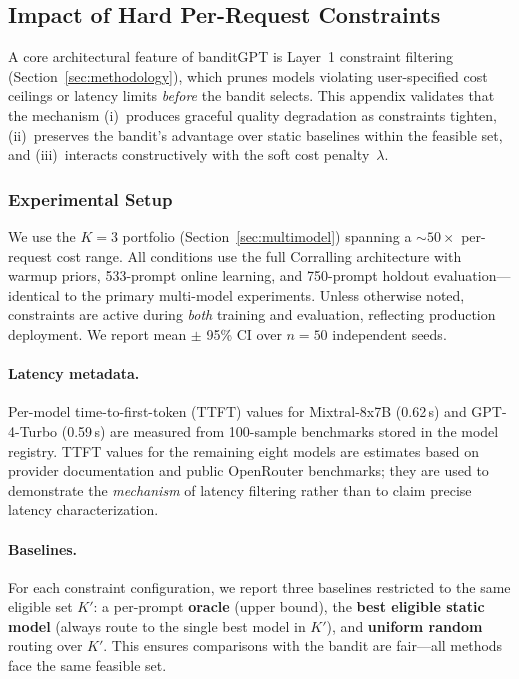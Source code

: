 
\subsection{Impact of Hard Per-Request Constraints}
\label{app:constraint_impact}

A core architectural feature of banditGPT is Layer~1 constraint filtering (Section~\ref{sec:methodology}), which prunes models violating user-specified cost ceilings or latency limits \emph{before} the bandit selects.
This appendix validates that the mechanism (i)~produces graceful quality degradation as constraints tighten, (ii)~preserves the bandit's advantage over static baselines within the feasible set, and (iii)~interacts constructively with the soft cost penalty~$\lambda$.

\subsubsection{Experimental Setup}

We use the $K{=}3$ portfolio (Section~\ref{sec:multimodel}) spanning a ${\sim}50\times$ per-request cost range.
All conditions use the full Corralling architecture with warmup priors, 533-prompt online learning, and 750-prompt holdout evaluation---identical to the primary multi-model experiments.
Unless otherwise noted, constraints are active during \emph{both} training and evaluation, reflecting production deployment.
We report mean $\pm$ 95\% CI over $n{=}50$ independent seeds.

\paragraph{Latency metadata.}
Per-model time-to-first-token (TTFT) values for Mixtral-8x7B (0.62\,s) and GPT-4-Turbo (0.59\,s) are measured from 100-sample benchmarks stored in the model registry.
TTFT values for the remaining eight models are estimates based on provider documentation and public OpenRouter benchmarks; they are used to demonstrate the \emph{mechanism} of latency filtering rather than to claim precise latency characterization.

\paragraph{Baselines.}
For each constraint configuration, we report three baselines restricted to the same eligible set $K'$: a per-prompt \textbf{oracle} (upper bound), the \textbf{best eligible static model} (always route to the single best model in $K'$), and \textbf{uniform random} routing over $K'$.
This ensures comparisons with the bandit are fair---all methods face the same feasible set.

